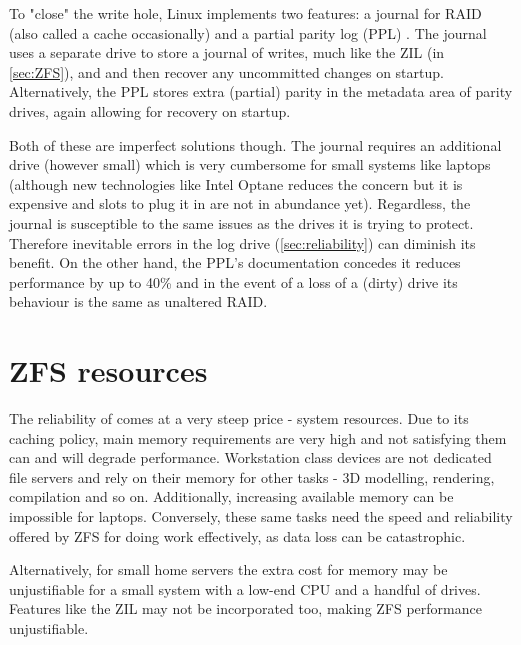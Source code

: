         To "close" the write hole, Linux implements two features: a journal for
        RAID \cite{LWN_md_journal} (also called a cache occasionally) and a
        partial parity log (PPL) \cite{partial_parity_log}. The journal uses a
        separate drive to store a journal of writes, much like the ZIL (in
        \autoref{sec:ZFS}),  and  and then
        recover any uncommitted changes on startup. Alternatively, the PPL
        stores extra (partial) parity in the metadata area of parity drives,
        again allowing for recovery on startup.

        Both of these are imperfect solutions though. The journal requires an
        additional drive (however small) which is very cumbersome for small
        systems like laptops (although new technologies like Intel Optane
        \cite{Intel_Optane} reduces the concern but it is expensive and slots
        to plug it in are not in abundance yet). Regardless, the journal is
        susceptible to the same issues as the drives it is trying to protect.
        Therefore inevitable errors in the log drive (\autoref{sec:reliability})
        can diminish its benefit. On the other hand, the PPL's  documentation
        \cite{partial_parity_log} concedes it reduces performance by up to 40\%
        and in the event of a loss of a (dirty) drive its behaviour is the same
        as unaltered RAID.

    \section{ZFS resources}

        The reliability of  comes at a very steep price - system resources.
        Due to its caching policy, main memory requirements are
        very high and not satisfying them can and will degrade performance.
        Workstation class devices are not dedicated file servers and rely on
        their memory for other tasks - 3D modelling, rendering, compilation
        and so on. Additionally, increasing available memory can be impossible
        for laptops. Conversely, these same tasks need the speed and
        reliability offered by ZFS for doing work effectively, as data loss can
        be catastrophic.

        Alternatively, for small home servers the extra cost for memory may be
        unjustifiable for a small system with a low-end CPU and a handful of
        drives. Features like the ZIL may not be incorporated too, making ZFS
        performance unjustifiable.

